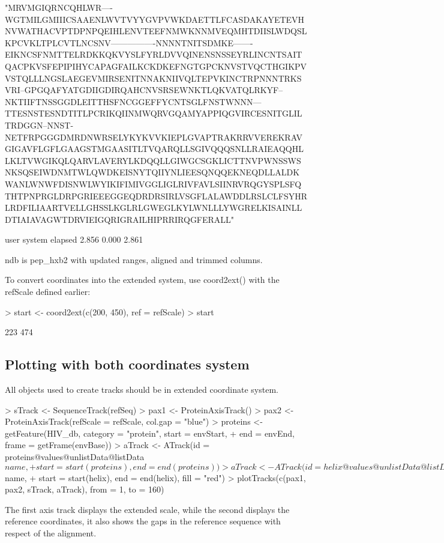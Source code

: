 \documentclass[11pt]{article}
\begin{document}
\begin{Schunk}
\begin{Soutput}
[7] "MRVMGIQRNCQHLWR----WGTMILGMIIICSAAENLWVTVYYGVPVWKDAETTLFCASDAKAYETEVHNVWATHACVPTDPNPQEIHLENVTEEFNMWKNNMVEQMHTDIISLWDQSLKPCVKLTPLCVTLNCSNV----------------NNNNTNITSDMKE-------EIKNCSFNMTTELRDKKQKVYSLFYRLDVVQINENSNSSEYRLINCNTSAITQACPKVSFEPIPIHYCAPAGFAILKCKDKEFNGTGPCKNVSTVQCTHGIKPVVSTQLLLNGSLAEGEVMIRSENITNNAKNIIVQLTEPVKINCTRPNNNTRKSVRI--GPGQAFYATGDIIGDIRQAHCNVSRSEWNKTLQKVATQLRKYF--NKTIIFTNSSGGDLEITTHSFNCGGEFFYCNTSGLFNSTWNNN---TTESNSTESNDTITLPCRIKQIINMWQRVGQAMYAPPIQGVIRCESNITGLILTRDGGN--NNST-NETFRPGGGDMRDNWRSELYKYKVVKIEPLGVAPTRAKRRVVEREKRAVGIGAVFLGFLGAAGSTMGAASITLTVQARQLLSGIVQQQSNLLRAIEAQQHLLKLTVWGIKQLQARVLAVERYLKDQQLLGIWGCSGKLICTTNVPWNSSWSNKSQSEIWDNMTWLQWDKEISNYTQIIYNLIEESQNQQEKNEQDLLALDKWANLWNWFDISNWLWYIKIFIMIVGGLIGLRIVFAVLSIINRVRQGYSPLSFQTHTPNPRGLDRPGRIEEEGGEQDRDRSIRLVSGFLALAWDDLRSLCLFSYHRLRDFILIAARTVELLGHSSLKGLRLGWEGLKYLWNLLLYWGRELKISAINLLDTIAIAVAGWTDRVIEIGQRIGRAILHIPRRIRQGFERALL"

   user  system elapsed 
  2.856   0.000   2.861 
\end{Soutput}
\end{Schunk}

ndb is pep_hxb2 with updated ranges, aligned and trimmed columns.

To convert coordinates into the extended system, use coord2ext() with the refScale defined earlier:
\begin{Schunk}
\begin{Sinput}
> start <- coord2ext(c(200, 450), ref = refScale)
> start
\end{Sinput}
\begin{Soutput}
[1] 223 474
\end{Soutput}
\end{Schunk}

\subsection{Plotting with both coordinates system}
All objects used to create tracks should be in extended coordinate system.
\begin{Schunk}
\begin{Sinput}
> sTrack <- SequenceTrack(refSeq)
> pax1 <- ProteinAxisTrack()
> pax2 <- ProteinAxisTrack(refScale = refScale, col.gap = "blue")
> proteins <- getFeature(HIV_db, category = "protein", start = envStart, 
+     end = envEnd, frame = getFrame(envBase))
> aTrack <- ATrack(id = proteins@values@unlistData@listData$name, 
+     start = start(proteins), end = end(proteins))
> aTrack <- ATrack(id = helix@values@unlistData@listData$name, 
+     start = start(helix), end = end(helix), fill = "red")
> plotTracks(c(pax1, pax2, sTrack, aTrack), from = 1, to = 160)
\end{Sinput}
\end{Schunk}
The first axis track displays the extended scale, while the second displays the reference coordinates, it also shows the gaps in the reference sequence with respect of the alignment.
\end{document}
